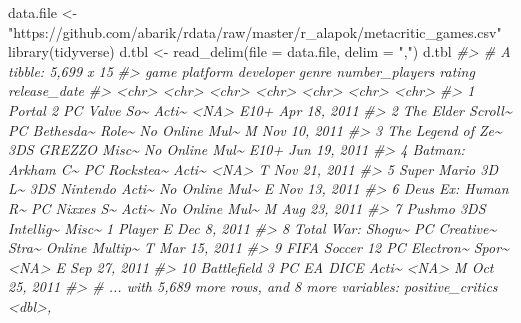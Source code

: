 \documentclass[
]{book}
\newenvironment{Shaded}{\begin{snugshade}}{\end{snugshade}}
\newcommand{\AttributeTok}[1]{\textcolor[rgb]{0.77,0.63,0.00}{#1}}
\newcommand{\CommentTok}[1]{\textcolor[rgb]{0.56,0.35,0.01}{\textit{#1}}}
\newcommand{\FunctionTok}[1]{\textcolor[rgb]{0.00,0.00,0.00}{#1}}
\newcommand{\NormalTok}[1]{#1}
\newcommand{\OtherTok}[1]{\textcolor[rgb]{0.56,0.35,0.01}{#1}}
\newcommand{\StringTok}[1]{\textcolor[rgb]{0.31,0.60,0.02}{#1}}
\begin{document}
\begin{Shaded}
\begin{Highlighting}[]
\NormalTok{data.file }\OtherTok{\textless{}{-}} \StringTok{"https://github.com/abarik/rdata/raw/master/r\_alapok/metacritic\_games.csv"}
\FunctionTok{library}\NormalTok{(tidyverse)}
\NormalTok{d.tbl }\OtherTok{\textless{}{-}} \FunctionTok{read\_delim}\NormalTok{(}\AttributeTok{file =}\NormalTok{ data.file, }\AttributeTok{delim =} \StringTok{","}\NormalTok{)}
\NormalTok{d.tbl}
\CommentTok{\#\textgreater{} \# A tibble: 5,699 x 15}
\CommentTok{\#\textgreater{}    game              platform developer genre number\_players rating release\_date}
\CommentTok{\#\textgreater{}    \textless{}chr\textgreater{}             \textless{}chr\textgreater{}    \textless{}chr\textgreater{}     \textless{}chr\textgreater{} \textless{}chr\textgreater{}          \textless{}chr\textgreater{}  \textless{}chr\textgreater{}       }
\CommentTok{\#\textgreater{}  1 Portal 2          PC       Valve So\textasciitilde{} Acti\textasciitilde{} \textless{}NA\textgreater{}           E10+   Apr 18, 2011}
\CommentTok{\#\textgreater{}  2 The Elder Scroll\textasciitilde{} PC       Bethesda\textasciitilde{} Role\textasciitilde{} No Online Mul\textasciitilde{} M      Nov 10, 2011}
\CommentTok{\#\textgreater{}  3 The Legend of Ze\textasciitilde{} 3DS      GREZZO    Misc\textasciitilde{} No Online Mul\textasciitilde{} E10+   Jun 19, 2011}
\CommentTok{\#\textgreater{}  4 Batman: Arkham C\textasciitilde{} PC       Rockstea\textasciitilde{} Acti\textasciitilde{} \textless{}NA\textgreater{}           T      Nov 21, 2011}
\CommentTok{\#\textgreater{}  5 Super Mario 3D L\textasciitilde{} 3DS      Nintendo  Acti\textasciitilde{} No Online Mul\textasciitilde{} E      Nov 13, 2011}
\CommentTok{\#\textgreater{}  6 Deus Ex: Human R\textasciitilde{} PC       Nixxes S\textasciitilde{} Acti\textasciitilde{} No Online Mul\textasciitilde{} M      Aug 23, 2011}
\CommentTok{\#\textgreater{}  7 Pushmo            3DS      Intellig\textasciitilde{} Misc\textasciitilde{} 1 Player       E      Dec  8, 2011}
\CommentTok{\#\textgreater{}  8 Total War: Shogu\textasciitilde{} PC       Creative\textasciitilde{} Stra\textasciitilde{} Online Multip\textasciitilde{} T      Mar 15, 2011}
\CommentTok{\#\textgreater{}  9 FIFA Soccer 12    PC       Electron\textasciitilde{} Spor\textasciitilde{} \textless{}NA\textgreater{}           E      Sep 27, 2011}
\CommentTok{\#\textgreater{} 10 Battlefield 3     PC       EA DICE   Acti\textasciitilde{} \textless{}NA\textgreater{}           M      Oct 25, 2011}
\CommentTok{\#\textgreater{} \# ... with 5,689 more rows, and 8 more variables: positive\_critics \textless{}dbl\textgreater{},}

\end{Highlighting}
\end{Shaded}
\end{document}
